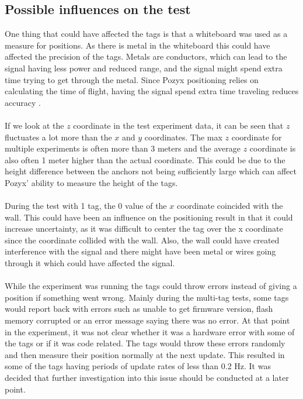 \subsection{Possible influences on the test}\label{subsec:influence-on-the-test}
One thing that could have affected the tags is that a whiteboard was used as a measure for positions.
As there is metal in the whiteboard this could have affected the precision of the tags.
Metals are conductors, which can lead to the signal having less power and reduced range, and the signal might spend extra time trying to get through the metal.
Since Pozyx positioning relies on calculating the time of flight, having the signal spend extra time traveling reduces accuracy \cite{pozyx-UWBObstacles}.
\\\\
If we look at the $z$ coordinate in the test experiment data, it can be seen that $z$ fluctuates a lot more than the $x$ and $y$ coordinates.
The max $z$ coordinate for multiple experiments is often more than 3 meters and the average $z$ coordinate is also often 1 meter higher than the actual coordinate.
This could be due to the height difference between the anchors not being sufficiently large which can affect Pozyx' ability to measure the height of the tags.
\\\\
During the test with 1 tag, the 0 value of the $x$ coordinate coincided with the wall.
This could have been an influence on the positioning result in that it could increase uncertainty, as it was difficult to center the tag over the x coordinate since the coordinate collided with the wall.
Also, the wall could have created interference with the signal and there might have been metal or wires going through it which could have affected the signal.
\\\\
While the experiment was running the tags could throw errors instead of giving a position if something went wrong.
Mainly during the multi-tag tests, some tags would report back with errors such as unable to get firmware version, flash memory corrupted or an error message saying there was no error.
At that point in the experiment, it was not clear whether it was a hardware error with some of the tags or if it was code related.
The tags would throw these errors randomly and then measure their position normally at the next update.
This resulted in some of the tags having periods of update rates of less than 0.2 Hz.
It was decided that further investigation into this issue should be conducted at a later point.

